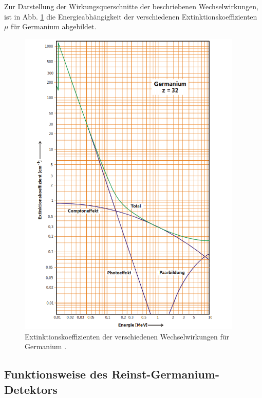     Zur Darstellung der Wirkungsquerschnitte der beschriebenen Wechselwirkungen, ist in Abb. \ref{fig:mu_koeff}
    die Energieabhängigkeit der verschiedenen Extinktionskoeffizienten $\mu$ für Germanium abgebildet.
    \begin{figure}
      \centering
      \includegraphics[width=0.95\textwidth]{mu_koeff.png}
      \caption{Extinktionskoeffizienten der verschiedenen Wechselwirkungen für Germanium \cite{anleitungv18}.}
      \label{fig:mu_koeff}
    \end{figure}

    \subsection{Funktionsweise des Reinst-Germanium-Detektors}

